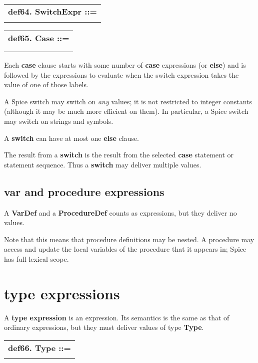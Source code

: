 \documentclass{report}
\begin{document}
\begin{tabular}{l}
{\bf def64. SwitchExpr ::= }\\ 
\hspace*{3mm}{\tt "switch" Expr Case+ "endswitch"} \\ 
\end{tabular}

\begin{tabular}{l}
{\bf def65. Case ::= }\\ 
\hspace*{3mm}{\tt ("case" Expr)+ "then" StatementSeq} \\ 
\hspace*{3mm}{\tt  $\mid$ "else" StatementSeq} \\ 
\end{tabular}

Each {\bf case} clause starts with some number of {\bf case} expressions (or
{\bf else}) and is followed by the expressions to evaluate when the switch
expression takes the value of one of those labels.

A Spice switch may switch on {\em any} values; it is not restricted to integer
constants (although it may be much more efficient on them). In particular, a
Spice switch may switch on strings and symbols.

A {\bf switch} can have at most one {\bf else} clause.

The result from a {\bf switch} is the result from the selected {\bf case} statement or
statement sequence. Thus a {\bf switch} may deliver multiple values.\subsection{var and procedure expressions}


A {\bf VarDef} and a {\bf ProcedureDef} counts as expressions, but they deliver
no values.

Note that this means that procedure definitions may be nested. A
procedure may access and update the local variables of the procedure that it
appears in; Spice has full lexical scope.\section{type expressions}


A {\bf type expression} is an expression. Its semantics is the same as that of
ordinary expressions, but they must deliver values of type {\bf Type}.

\begin{tabular}{l}
{\bf def66. Type ::= }\\ 
\hspace*{3mm}{\tt Expr} \\ 
\end{tabular}
\end{document}
